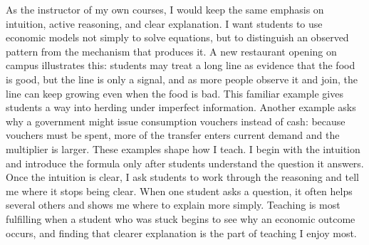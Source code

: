 \documentclass[11pt]{article}
\begin{document}
As the instructor of my own courses, I would keep the same emphasis on intuition, active reasoning, and clear explanation. I want students to use economic models not simply to solve equations, but to distinguish an observed pattern from the mechanism that produces it. A new restaurant opening on campus illustrates this: students may treat a long line as evidence that the food is good, but the line is only a signal, and as more people observe it and join, the line can keep growing even when the food is bad. This familiar example gives students a way into herding under imperfect information. Another example asks why a government might issue consumption vouchers instead of cash: because vouchers must be spent, more of the transfer enters current demand and the multiplier is larger. These examples shape how I teach. I begin with the intuition and introduce the formula only after students understand the question it answers. Once the intuition is clear, I ask students to work through the reasoning and tell me where it stops being clear. When one student asks a question, it often helps several others and shows me where to explain more simply. Teaching is most fulfilling when a student who was stuck begins to see why an economic outcome occurs, and finding that clearer explanation is the part of teaching I enjoy most.
\end{document}
